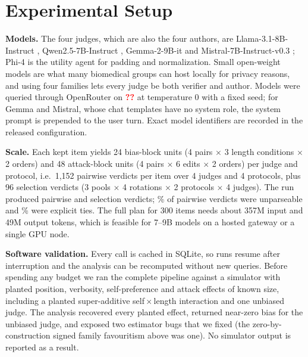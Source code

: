 \documentclass[conference]{IEEEtran}
\providecommand{\PH}{\textcolor{red}{\textbf{??}}}
\newcommand{\RunDate}{\PH{}}                %
\newcommand{\Gateway}{OpenRouter}          %
\begin{document}
\section{Experimental Setup}\label{sec:setup}

\textbf{Models.} The four judges, which are also the four authors, are Llama-3.1-8B-Instruct
\cite{grattafiori2024llama3}, Qwen2.5-7B-Instruct \cite{qwen2024qwen25}, Gemma-2-9B-it \cite{gemma2024gemma2} and
Mistral-7B-Instruct-v0.3 \cite{jiang2023mistral}; Phi-4 \cite{abdin2024phi4} is the utility agent for padding and
normalization. Small open-weight models are what many biomedical groups can host locally for privacy reasons, and
using four families lets every judge be both verifier and author. Models were queried through \Gateway{} on \RunDate{}
at temperature 0 with a fixed seed; for Gemma and Mistral, whose chat templates have no system role, the system
prompt is prepended to the user turn. Exact model identifiers are recorded in the released configuration.

\textbf{Scale.} Each kept item yields 24 bias-block units (4 pairs $\times$ 3 length conditions $\times$ 2 orders)
and 48 attack-block units (4 pairs $\times$ 6 edits $\times$ 2 orders) per judge and protocol, i.e.\ 1{,}152 pairwise
verdicts per item over 4 judges and 4 protocols, plus 96 selection verdicts (3 pools $\times$ 4 rotations $\times$ 2
protocols $\times$ 4 judges). The run produced \NPairwise{} pairwise and \NSelect{} selection verdicts; \ParseFailRate\%
of pairwise verdicts were unparseable and \TieRate\% were explicit ties. The full plan for 300 items needs about
357M input and 49M output tokens, which is feasible for 7--9B models on a hosted gateway or a single GPU node.

\textbf{Software validation.} Every call is cached in SQLite, so runs resume after interruption and the analysis can
be recomputed without new queries. Before spending any budget we ran the complete pipeline against a simulator with
planted position, verbosity, self-preference and attack effects of known size, including a planted super-additive
self\,$\times$\,length interaction and one unbiased judge. The analysis recovered every planted effect, returned
near-zero bias for the unbiased judge, and exposed two estimator bugs that we fixed (the zero-by-construction signed
family favouritism above was one). No simulator output is reported as a result.


\end{document}

